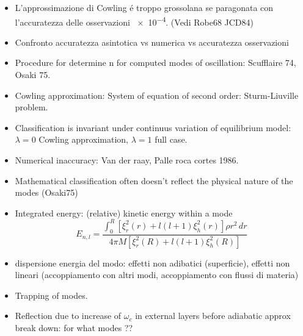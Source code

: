 \documentclass[oneside,12pt,fleqn]{memoir}
\begin{document}
{\begin{itemize}
    \begin{equation*}
    \frac{\xi_h(R)}{\xi_r(R)}\approx\frac{GM}{R^3}\frac{L}{\omega^2}
    \end{equation*}
    
    \item L'approssimazione di Cowling \'e troppo grossolana se paragonata con l'accuratezza delle osservazioni \num{e-4}.
    (Vedi Robe68 JCD84)
    
    \item Confronto accuratezza asintotica vs numerica vs accuratezza osservazioni
    
    \item Procedure for determine n for computed modes of oscillation: Scufflaire 74, Osaki 75.
    
    \item Cowling approximation: System of equation of second order: Sturm-Liuville problem.
    \item Classification is invariant under continuus variation of equilibrium model: $\lambda=0$ Cowling approximation, $\lambda=1$ full case.
    
    \item Numerical inaccuracy: Van der raay, Palle roca cortes 1986.
    
    \item Mathematical classification often doesn't reflect the physical nature of the modes (Osaki75)
    
    \item Integrated energy: (relative) kinetic energy within a mode
    \begin{equation*}
    E_{n,l}=\frac{\int_0^R[\xi^2_r(r)+l(l+1)\xi_h^2(r)]\rho r^2\,dr}{4\pi M[\xi^2_r(R)+l(l+1)\xi_h^2(R)]}
    \end{equation*}
    
    \item dispersione energia del modo: effetti non adibatici (superficie), effetti non lineari (accoppiamento con altri modi, accoppiamento con flussi di materia)
    
    \item Trapping of modes.
    
    \item Reflection due to increase of $\omega_c$ in external layers before adiabatic approx break down: for what modes ??
    

\end{itemize}}
\end{document}
